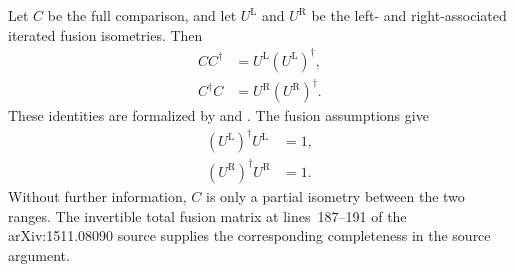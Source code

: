 \documentclass{article}
\begin{document}
Let $C$ be the full comparison, and let $U^{\mathrm L}$ and
$U^{\mathrm R}$ be the left- and right-associated iterated fusion
isometries. Then
\begin{align}
    CC^\dagger
        &= U^{\mathrm L}(U^{\mathrm L})^\dagger,
\label{eq:cpgsv17_blocked_chi_uniformity_left_range_projection}\\
    C^\dagger C
        &= U^{\mathrm R}(U^{\mathrm R})^\dagger.
\label{eq:cpgsv17_blocked_chi_uniformity_right_range_projection}
\end{align}
These identities are formalized by
and
.
The fusion assumptions give
\begin{align}
    (U^{\mathrm L})^\dagger U^{\mathrm L}
        &= 1,
\label{eq:cpgsv17_blocked_chi_uniformity_left_isometry}\\
    (U^{\mathrm R})^\dagger U^{\mathrm R}
        &= 1.
\label{eq:cpgsv17_blocked_chi_uniformity_right_isometry}
\end{align}
Without further information, $C$ is only a partial isometry between the two
ranges. The invertible total fusion matrix at lines~187--191 of the
arXiv:1511.08090 source supplies the corresponding completeness in the source
argument.
\end{document}
